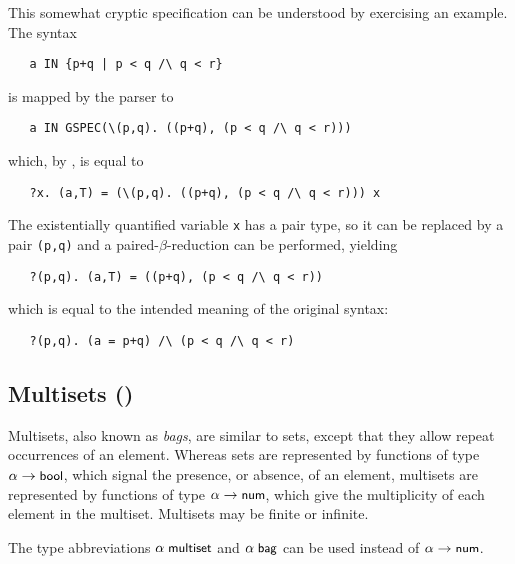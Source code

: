 This somewhat cryptic specification can be understood by exercising an
example. The syntax
%
\begin{hol}
\begin{verbatim}
   a IN {p+q | p < q /\ q < r}
\end{verbatim}
\end{hol}
%
is mapped by the \HOL{} parser to
\begin{hol}
\begin{verbatim}
   a IN GSPEC(\(p,q). ((p+q), (p < q /\ q < r)))
\end{verbatim}
\end{hol}
%
which, by , is equal to
\begin{hol}
\begin{verbatim}
   ?x. (a,T) = (\(p,q). ((p+q), (p < q /\ q < r))) x
\end{verbatim}
\end{hol}
%
The existentially quantified variable \verb+x+ has a pair type,
so it can be replaced by a pair \verb+(p,q)+ and a
paired-$\beta$-reduction can be performed, yielding
%
\begin{hol}
\begin{verbatim}
   ?(p,q). (a,T) = ((p+q), (p < q /\ q < r))
\end{verbatim}
\end{hol}
%
which is equal to the intended meaning of the original
syntax:
%
\begin{hol}
\begin{verbatim}
   ?(p,q). (a = p+q) /\ (p < q /\ q < r)
\end{verbatim}
\end{hol}

\subsection{Multisets ()}\label{multiset}

Multisets, also known as \emph{bags}, are similar to sets, except that
they allow repeat occurrences of an element. Whereas sets are
represented by functions of type $\alpha\to\mbox{\small{\textbf{\sf{bool}}}}$, which signal
the presence, or absence, of an element, multisets are represented
by functions of type $\alpha\to\mbox{\small{\textbf{\sf{num}}}}$, which give the
multiplicity of each element in the multiset. Multisets may be finite
or infinite.

The type abbreviations $\alpha\;\mbox{\small{\textbf{\sf{multiset}}}}$ and
$\alpha\;\mbox{\small{\textbf{\sf{bag}}}}$ can be used instead of $\alpha\to\mbox{\small{\textbf{\sf{num}}}}$.

